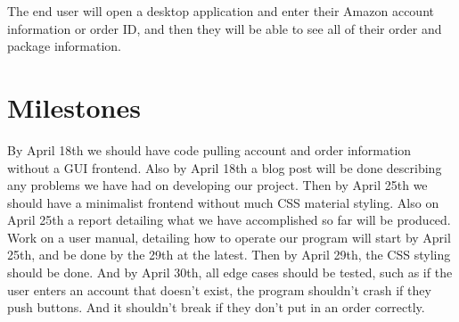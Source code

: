 \documentclass[letter]{article}
\begin{document}
The end user will open a desktop application and enter their Amazon account information or order ID, and then they will be able to see all of their order and package information.

\section*{Milestones}

By April 18th we should have code pulling account and order information without a GUI frontend. Also by April 18th a blog post will be done describing any problems we have had on developing our project. Then by April 25th we should have a minimalist frontend without much CSS material styling. Also on April 25th a report detailing what we have accomplished so far will be produced. Work on a user manual, detailing how to operate our program will start by April 25th, and be done by the 29th at the latest. Then by April 29th, the CSS styling should be done. And by April 30th, all edge cases should be tested, such as if the user enters an account that doesn't exist, the program shouldn't crash if they push buttons. And it shouldn't break if they don't put in an order correctly.
\end{document}
